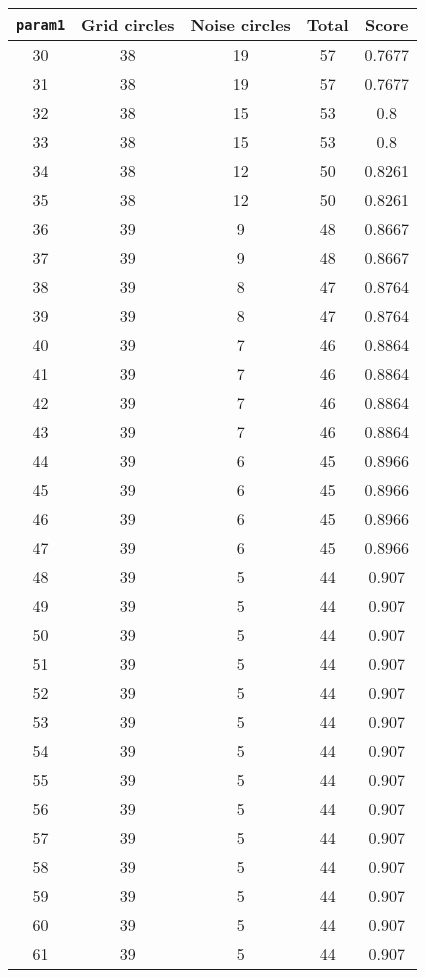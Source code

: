 \documentclass[letterpaper, 12pt]{article}
\begin{document}
\begin{longtable}{|c|c|c|c|c|}
\hline
\textbf{\texttt{param1}} & \textbf{Grid circles} & \textbf{Noise circles} & \textbf{Total} & \textbf{Score} \\
\hline
30 & 38 & 19 & 57 & 0.7677 \\
\hline
31 & 38 & 19 & 57 & 0.7677 \\
\hline
32 & 38 & 15 & 53 & 0.8 \\
\hline
33 & 38 & 15 & 53 & 0.8 \\
\hline
34 & 38 & 12 & 50 & 0.8261 \\
\hline
35 & 38 & 12 & 50 & 0.8261 \\
\hline
36 & 39 & 9 & 48 & 0.8667 \\
\hline
37 & 39 & 9 & 48 & 0.8667 \\
\hline
38 & 39 & 8 & 47 & 0.8764 \\
\hline
39 & 39 & 8 & 47 & 0.8764 \\
\hline
40 & 39 & 7 & 46 & 0.8864 \\
\hline
41 & 39 & 7 & 46 & 0.8864 \\
\hline
42 & 39 & 7 & 46 & 0.8864 \\
\hline
43 & 39 & 7 & 46 & 0.8864 \\
\hline
44 & 39 & 6 & 45 & 0.8966 \\
\hline
45 & 39 & 6 & 45 & 0.8966 \\
\hline
46 & 39 & 6 & 45 & 0.8966 \\
\hline
47 & 39 & 6 & 45 & 0.8966 \\
\hline
48 & 39 & 5 & 44 & 0.907 \\
\hline
49 & 39 & 5 & 44 & 0.907 \\
\hline
50 & 39 & 5 & 44 & 0.907 \\
\hline
51 & 39 & 5 & 44 & 0.907 \\
\hline
52 & 39 & 5 & 44 & 0.907 \\
\hline
53 & 39 & 5 & 44 & 0.907 \\
\hline
54 & 39 & 5 & 44 & 0.907 \\
\hline
55 & 39 & 5 & 44 & 0.907 \\
\hline
56 & 39 & 5 & 44 & 0.907 \\
\hline
57 & 39 & 5 & 44 & 0.907 \\
\hline
58 & 39 & 5 & 44 & 0.907 \\
\hline
59 & 39 & 5 & 44 & 0.907 \\
\hline
60 & 39 & 5 & 44 & 0.907 \\
\hline
61 & 39 & 5 & 44 & 0.907 \\

\end{longtable}
\end{document}
